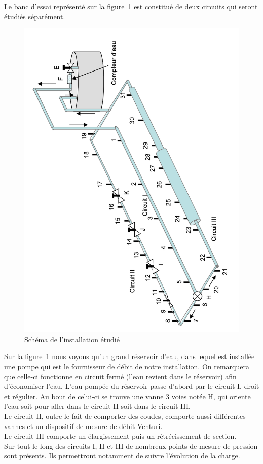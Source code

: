 \documentclass[12pt, a4paper, twoside]{article} %
\begin{document}
Le banc d'essai représenté sur la figure~\ref{fig:instal} est constitué de deux circuits qui seront étudiés séparément. 
\begin{figure}
    \centering
    \includegraphics[angle=-90, width = \linewidth]{instal.pdf}
    \caption{Schéma de l'installation étudié}
    \label{fig:instal}
\end{figure}

Sur la figure~\ref{fig:instal} nous voyons qu'un grand réservoir d'eau, dans lequel est installée une pompe  qui est le fournisseur de débit de notre installation. On remarquera que celle-ci fonctionne en circuit fermé (l'eau revient dans le réservoir) afin d'économiser l'eau. L'eau pompée du réservoir passe d'abord par le circuit I, droit et régulier. Au bout de celui-ci se trouve une vanne 3 voies notée H, qui oriente l'eau soit pour aller dans le circuit II soit dans le circuit III.
\\Le circuit II, outre le fait de comporter des coudes, comporte aussi différentes vannes et un dispositif de mesure de débit Venturi.
\\Le circuit III comporte un élargissement puis un rétrécissement de section.
\\Sur tout le long des circuits I, II et III de nombreux points de mesure de pression sont présents. Ils permettront notamment de suivre l'évolution de la charge.
\end{document}
